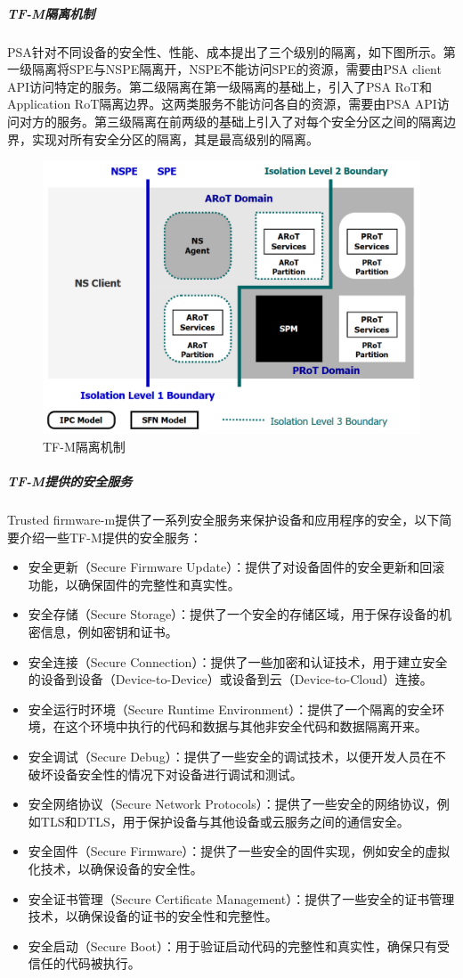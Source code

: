 \documentclass[12pt,a4paper]{ctexart}
\begin{document}
\subparagraph{TF-M隔离机制}
\par PSA针对不同设备的安全性、性能、成本提出了三个级别的隔离，如下图所示。第一级隔离将SPE与NSPE隔离开，NSPE不能访问SPE的资源，需要由PSA client API访问特定的服务。第二级隔离在第一级隔离的基础上，引入了PSA RoT和Application RoT隔离边界。这两类服务不能访问各自的资源，需要由PSA API访问对方的服务。第三级隔离在前两级的基础上引入了对每个安全分区之间的隔离边界，实现对所有安全分区的隔离，其是最高级别的隔离。
\begin{figure}
    \centering
    \includegraphics[scale=0.27]{graph/isolation.png}
    \caption{TF-M隔离机制}
\end{figure}
\subparagraph{TF-M提供的安全服务}
\par Trusted firmware-m提供了一系列安全服务来保护设备和应用程序的安全，以下简要介绍一些TF-M提供的安全服务：
\begin{itemize}
    \item 安全更新（Secure Firmware Update）：提供了对设备固件的安全更新和回滚功能，以确保固件的完整性和真实性。
    \item 安全存储（Secure Storage）：提供了一个安全的存储区域，用于保存设备的机密信息，例如密钥和证书。
    \item 安全连接（Secure Connection）：提供了一些加密和认证技术，用于建立安全的设备到设备（Device-to-Device）或设备到云（Device-to-Cloud）连接。
    \item 安全运行时环境（Secure Runtime Environment）：提供了一个隔离的安全环境，在这个环境中执行的代码和数据与其他非安全代码和数据隔离开来。
    \item 安全调试（Secure Debug）：提供了一些安全的调试技术，以便开发人员在不破坏设备安全性的情况下对设备进行调试和测试。
    \item 安全网络协议（Secure Network Protocols）：提供了一些安全的网络协议，例如TLS和DTLS，用于保护设备与其他设备或云服务之间的通信安全。
    \item 安全固件（Secure Firmware）：提供了一些安全的固件实现，例如安全的虚拟化技术，以确保设备的安全性。
    \item 安全证书管理（Secure Certificate Management）：提供了一些安全的证书管理技术，以确保设备的证书的安全性和完整性。
    \item  安全启动（Secure Boot）：用于验证启动代码的完整性和真实性，确保只有受信任的代码被执行。
\end{itemize}
\end{document}
